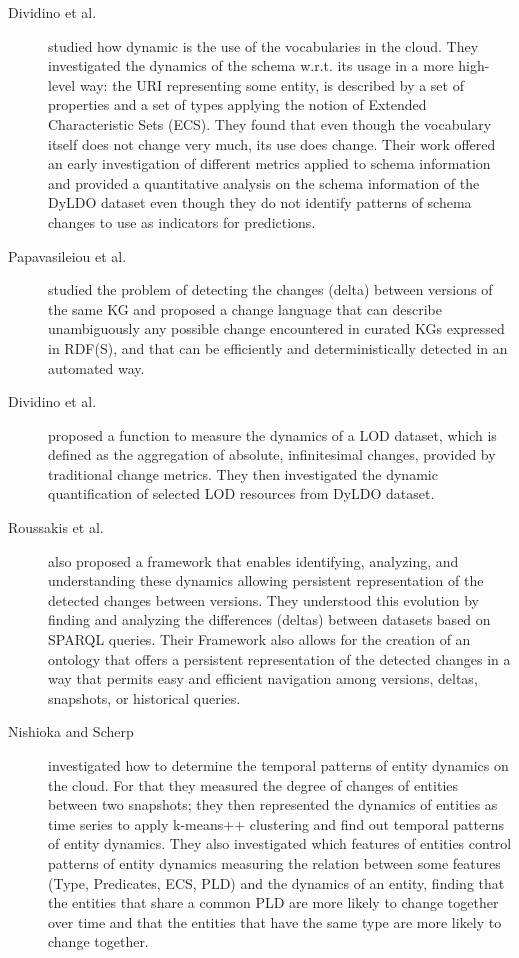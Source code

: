 \documentclass[sw]{iosart2x}
\begin{document}
\begin{description}
	\item[Dividino et al. \cite{DividinoSGG13}] studied how dynamic is the use of the vocabularies in the cloud. They investigated the dynamics of the schema w.r.t. its usage in a more high-level way: the URI representing some entity, is described by a set of properties and a set of types applying the notion of Extended Characteristic Sets (ECS). They found that even though the vocabulary itself does not change very much, its use does change. Their work offered an early investigation of different metrics applied to schema information and provided a quantitative analysis on the schema information of the DyLDO dataset even though they do not identify patterns of schema changes to use as indicators for predictions.
	
	\item[Papavasileiou et al. \cite{PapavasileiouFFKC13}] studied the problem of detecting the changes (delta) between versions of the same KG and proposed a change language that can describe unambiguously any possible change encountered in curated KGs expressed in RDF(S), and that can be efficiently and deterministically detected in an automated way.
	
	\item[Dividino et al. \cite{DividinoGSG14}] proposed a function to measure the dynamics of a LOD dataset, which is defined as the aggregation of absolute, infinitesimal changes, provided by traditional change metrics. They then investigated the dynamic quantification of selected LOD resources from DyLDO dataset.
	
	\item[Roussakis et al. \cite{RoussakisCSFS15}] also proposed a framework that enables identifying, analyzing, and understanding these dynamics allowing persistent representation of the detected changes between versions. They understood this evolution by finding and analyzing the differences (deltas) between datasets based on SPARQL queries. Their Framework also allows for the creation of an ontology that offers a persistent representation of the detected changes in a way that permits easy and efficient navigation among versions, deltas, snapshots, or historical queries.
	
	\item[Nishioka and Scherp \cite{NishiokaS15, NishiokaS16}] investigated how to determine the temporal patterns of entity dynamics on the cloud. For that they measured the degree of changes of entities between two snapshots; they then represented the dynamics of entities as time series to apply k-means++ clustering and find out temporal patterns of entity dynamics. They also investigated which features of entities control patterns of entity dynamics measuring the relation between some features (Type, Predicates, ECS, PLD) and the dynamics of an entity, finding that the entities that share a common PLD are more likely to change together over time and that the entities that have the same type are more likely to change together.
	

\end{description}
\end{document}
